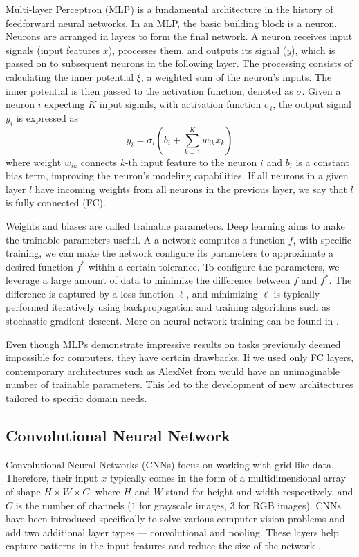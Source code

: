 Multi-layer Perceptron (MLP) is a fundamental architecture in the history of feedforward neural networks.
In an MLP, the basic building block is a neuron.
Neurons are arranged in layers to form the final network.
A neuron receives input signals (input features $x$), processes them, and outputs its signal ($y$), which is passed on to subsequent neurons in the following layer.
The processing consists of calculating the inner potential $\xi$, a weighted sum of the neuron's inputs.
The inner potential is then passed to the activation function, denoted as $\sigma$. 
Given a neuron $i$ expecting $K$ input signals, with activation function $\sigma_i$, the output signal $y_i$ is expressed as
\begin{equation}
    y_i = \sigma_i(b_i + \sum_{k=1}^K w_{ik}x_k)
\end{equation}
where weight $w_{ik}$ connects $k$-th input feature to the neuron $i$ and $b_i$ is a constant bias term, improving the neuron's modeling capabilities.
If all neurons in a given layer $l$ have incoming weights from all neurons in the previous layer, we say that $l$ is fully connected (FC).

Weights and biases are called trainable parameters. %
Deep learning aims to make the trainable parameters useful.
A a network computes a function $f$, with specific training, we can make the network configure its parameters to approximate a desired function $f^*$ within a certain tolerance.
To configure the parameters, we leverage a large amount of data to minimize the difference between $f$ and $f^*$.
The difference is captured by a loss function $\ell$, and minimizing $\ell$ is typically performed iteratively using backpropagation and training algorithms such as stochastic gradient descent.
More on neural network training can be found in \cite{goodfellow}.

Even though MLPs demonstrate impressive results on tasks previously deemed impossible for computers, they have certain drawbacks.
If we used only FC layers, contemporary architectures such as AlexNet from \cite{alexnet} would have an unimaginable number of trainable parameters.
This led to the development of new architectures tailored to specific domain needs.

\subsection*{Convolutional Neural Network}
Convolutional Neural Networks (CNNs) focus on working with grid-like data.
Therefore, their input $x$ typically comes in the form of a multidimensional array of shape $H \times W \times C$, where $H$ and $W$ stand for height and width respectively, and $C$ is the number of channels ($1$ for grayscale images, $3$ for RGB images).
CNNs have been introduced specifically to solve various computer vision problems and add two additional layer types --- convolutional and pooling.
These layers help capture patterns in the input features and reduce the size of the network \cite{cnns}. 

